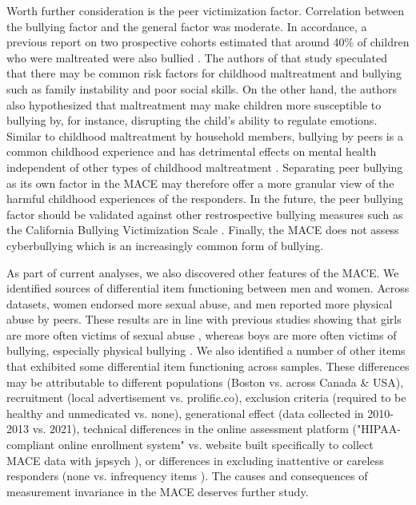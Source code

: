 \documentclass[letterpaper,man,natbib]{apa6}  %
\begin{document}
Worth further consideration is the peer victimization factor. Correlation between the bullying factor and the general factor was moderate. In accordance, a previous report on two prospective cohorts estimated that around 40\% of children who were maltreated were also bullied \citep{lereya2015adult}. The authors of that study speculated that there may be common risk factors for childhood maltreatment and bullying such as family instability and poor social skills. On the other hand, the authors also hypothesized that maltreatment may make children more susceptible to bullying by, for instance, disrupting the child's ability to regulate emotions. Similar to childhood maltreatment by household members, bullying by peers is a common childhood experience \citep{world2020spotlight} and has detrimental effects on mental health independent of other types of childhood maltreatment \citep{singham2017concurrent, lereya2015adult}. Separating peer bullying as its own factor in the MACE may therefore offer a more granular view of the harmful childhood experiences of the responders. In the future, the peer bullying factor should be validated against other restrospective bullying measures such as the California Bullying Victimization Scale \citep{green2018initial}. Finally, the MACE does not assess cyberbullying which is an increasingly common form of bullying. 

As part of current analyses, we also discovered other features of the MACE. We identified sources of differential item functioning between men and women. Across datasets, women endorsed more sexual abuse, and men reported more physical abuse by peers. These results are in line with previous studies showing that girls are more often victims of sexual abuse \citep{stoltenborgh2015prevalence}, whereas boys are more often victims of bullying, especially physical bullying \citep{scheithauer2006physical}. We also identified a number of other items that exhibited some differential item functioning across samples. These differences may be attributable to different populations (Boston vs. across Canada \& USA), recruitment (local advertisement vs. prolific.co), exclusion criteria (required to be healthy and unmedicated vs. none), generational effect (data collected in 2010-2013 vs. 2021), technical differences in the online assessment platform ("HIPAA-compliant online enrollment system" vs. website built specifically to collect MACE data with jspsych \citep{de2015jspsych}), or differences in excluding inattentive or careless responders (none vs. infrequency items \citep{zorowitz2021inattentive}). The causes and consequences of measurement invariance in the MACE deserves further study. 
\end{document}
